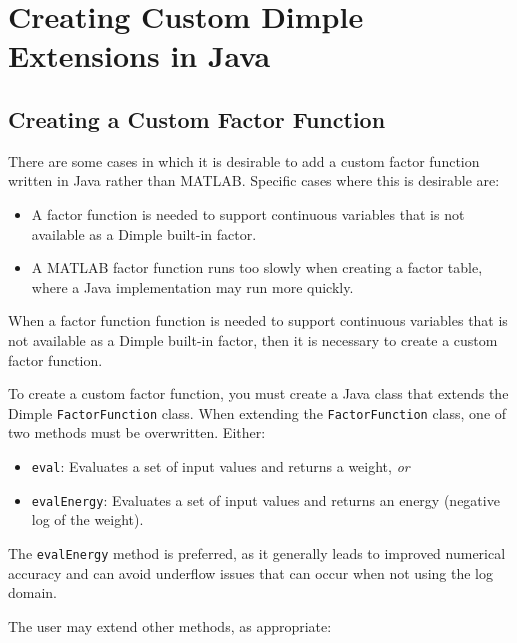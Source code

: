 \section{Creating Custom Dimple Extensions \ifmatlab in Java\fi}
\label{sec:userJava}

\subsection{Creating a Custom Factor Function}

\ifmatlab
There are some cases in which it is desirable to add a custom factor function written in Java rather than MATLAB.  Specific cases where this is desirable are:
%
\begin{itemize}
\item A factor function is needed to support continuous variables that is not available as a Dimple built-in factor.
\item A MATLAB factor function runs too slowly when creating a factor table, where a Java implementation may run more quickly.
\end{itemize}
\fi

\ifjava
When a factor function function is needed to support continuous variables that is not available as a Dimple built-in factor, then it is necessary to create a custom factor function.
\fi

To create a custom factor function, you must create a Java class that extends the Dimple \texttt{FactorFunction} class.  When extending the \texttt{FactorFunction} class, one of two methods must be overwritten.  Either:
%
\begin{itemize}
\item \texttt{eval}: Evaluates a set of input values and returns a weight, \emph{or}
\item \texttt{evalEnergy}: Evaluates a set of input values and returns an energy (negative log of the weight).
\end{itemize}

The \texttt{evalEnergy} method is preferred, as it generally leads to improved numerical accuracy and can avoid underflow issues that can occur when not using the log domain.

The user may extend other methods, as appropriate:

